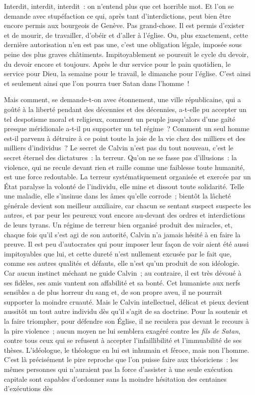 \documentclass[french,twoside]{book} %
\newcommand{\astermono}{\medskip\centerline{\color{rubric}\large\selectfont{\syms ✻}}\medskip\par}%
\begin{document}
Interdit, interdit, interdit : on n’entend plus que cet horrible mot. Et l’on se demande avec stupéfaction ce qui, après tant d’interdictions, peut bien être encore permis aux bourgeois de Genève. Pas grand-chose. Il est permis d’exister et de mourir, de travailler, d’obéir et d’aller à l’église. Ou, plus exactement, cette dernière autorisation n’en est pas une, c’est une obligation légale, imposée sous peine des plus graves châtiments. Impitoyablement se poursuit le cycle du devoir, du devoir encore et toujours. Après le dur service pour le pain quotidien, le service pour Dieu, la semaine pour le travail, le dimanche pour l’église. C’est ainsi et seulement ainsi que l’on pourra tuer Satan dans l’homme !\par

\astermono

\noindent Mais comment, se demande-t-on avec étonnement, une ville républicaine, qui a goûté à la liberté pendant des décennies et des décennies, a-t-elle pu accepter un tel despotisme moral et religieux, comment un peuple jusqu’alors d’une gaîté presque méridionale a-t-il pu supporter un tel régime ? Comment un seul homme est-il parvenu à détruire à ce point toute la joie de la vie chez des milliers et des milliers d’individus ? Le secret de Calvin n’est pas du tout nouveau, c’est le secret éternel des dictatures : la terreur. Qu’on ne se fasse pas d’illusions : la violence, qui ne recule devant rien et raille comme une faiblesse toute humanité, est une force redoutable. La terreur systématiquement organisée et exercée par un État paralyse la volonté de l’individu, elle mine et dissout toute solidarité. Telle une maladie, elle s’insinue dans les âmes qu’elle corrode ; bientôt la lâcheté générale devient son meilleur auxiliaire, car chacun se sentant suspect suspecte les autres, et par peur les peureux vont encore au-devant des ordres et interdictions de leurs tyrans. Un régime de terreur bien organisé produit des miracles, et, chaque fois qu’il s’est agi de son autorité, Calvin n’a jamais hésité à en faire la preuve. Il est peu d’autocrates qui pour imposer leur façon de voir aient été aussi impitoyables que lui, et cette dureté n’est nullement excusée par le fait que, comme ses autres qualités et défauts, elle n’est qu’un produit de son idéologie. Car aucun instinct méchant ne guide Calvin ; au contraire, il est très dévoué à ses fidèles, ses amis vantent son affabilité et sa bonté. Cet humaniste aux nerfs sensibles a de plus horreur du sang et, de son propre aveu, il ne pourrait supporter la moindre cruauté. Mais le Calvin intellectuel, délicat et pieux devient aussitôt un tout autre individu dès qu’il s’agit de sa doctrine. Pour la soutenir et la faire triompher, pour défendre son Église, il ne reculera pas devant le recours à la pire violence ; aucun moyen ne lui semblera exagéré contre les \emph{fils de Satan}, contre tous ceux qui se refusent à accepter l’infaillibilité et l’immuabilité de ses thèses. L’idéologue, le théologue en lui est inhumain et féroce, mais non l’homme. C’est là précisément le pire reproche que l’on puisse faire aux théoriciens : les mêmes personnes qui n’auraient pas la force d’assister à une seule exécution capitale sont capables d’ordonner sans la moindre hésitation des centaines d’exécutions dès 
\end{document}
